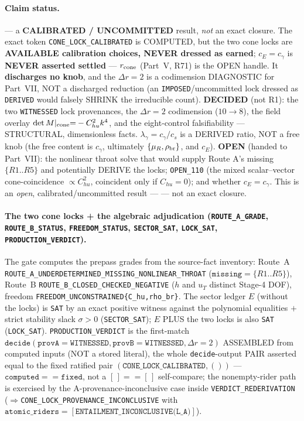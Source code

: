 \paragraph{Claim status.}
\StatusOpen{} --- a \textbf{CALIBRATED / UNCOMMITTED} result, \emph{not} an exact
closure. The exact token \texttt{CONE\_LOCK\_CALIBRATED} is COMPUTED, but the two
cone locks are \textbf{AVAILABLE calibration choices, NEVER dressed as earned};
\(c_E{=}c_\gamma\) is \textbf{NEVER asserted settled} --- \(r_{\rm cone}\)
(Part~V, R71) is the OPEN handle. It \textbf{discharges no knob}, and the
\(\Delta r{=}2\) is a codimension DIAGNOSTIC for Part~VII, NOT a discharged
reduction (an \texttt{IMPOSED}/uncommitted lock dressed as \texttt{DERIVED} would
falsely SHRINK the irreducible count). \textbf{DECIDED} (not R1): the two
\texttt{WITNESSED} lock provenances, the \(\Delta r{=}2\) codimension
(\(10\to8\)), the field overlay \(\det M|_{\rm cone}{=}-C_{hu}^2k^4\), and the
eight-control falsifiability --- STRUCTURAL, dimensionless facts.
\(\lambda_\gamma{=}c_\gamma/c_s\) is a DERIVED ratio, NOT a free knob (the free
content is \(c_\gamma\), ultimately \(\{\mu_R,\rho_{\rm br}\}\), and \(c_E\)).
\textbf{OPEN} (handed to Part~VII): the nonlinear throat solve that would supply
Route A's missing \(\{R1..R5\}\) and potentially DERIVE the locks;
\texttt{OPEN\_110} (the mixed scalar--vector cone-coincidence \(\propto C_{hu}^2\),
coincident only if \(C_{hu}{=}0\)); and whether \(c_E{=}c_\gamma\). This is an
\emph{open}, calibrated/uncommitted result --- \StatusOpen{} --- not an exact
closure.

\paragraph{The two cone locks + the algebraic adjudication (\texttt{ROUTE\_A\_GRADE}, \texttt{ROUTE\_B\_STATUS}, \texttt{FREEDOM\_STATUS}, \texttt{SECTOR\_SAT}, \texttt{LOCK\_SAT}, \texttt{PRODUCTION\_VERDICT}).}
The gate computes the prepass grades from the source-fact inventory: Route~A
\texttt{ROUTE\_A\_UNDERDETERMINED\_MISSING\_NONLINEAR\_THROAT}
(\(\texttt{missing}{=}\{R1..R5\}\)), Route~B
\texttt{ROUTE\_B\_CLOSED\_CHECKED\_NEGATIVE} (\(h\) and \(u_T\) distinct Stage-4
DOF), freedom \texttt{FREEDOM\_UNCONSTRAINED\{C\_hu,rho\_br\}}. The sector ledger
\(E\) (without the locks) is \texttt{SAT} by an exact positive witness against the
polynomial equalities \(+\) strict stability slack \(\sigma>0\)
(\texttt{SECTOR\_SAT}); \(E\) PLUS the two locks is also \texttt{SAT}
(\texttt{LOCK\_SAT}). \texttt{PRODUCTION\_VERDICT} is the first-match
\(\texttt{decide}(\texttt{provA}{=}\texttt{WITNESSED},\texttt{provB}{=}\texttt{WITNESSED},\Delta r{=}2)\)
ASSEMBLED from computed inputs (NOT a stored literal), the whole
\texttt{decide}-output PAIR asserted equal to the fixed ratified pair
\((\texttt{CONE\_LOCK\_CALIBRATED},())\) --- \(\texttt{computed}==\texttt{fixed}\),
not a \([\,]{==}[\,]\) self-compare; the nonempty-rider path is exercised by the
A-provenance-inconclusive case inside \texttt{VERDICT\_REDERIVATION}
(\(\Rightarrow\)\texttt{CONE\_LOCK\_PROVENANCE\_INCONCLUSIVE} with
\(\texttt{atomic\_riders}{=}[\texttt{ENTAILMENT\_INCONCLUSIVE(L\_A)}]\)).

